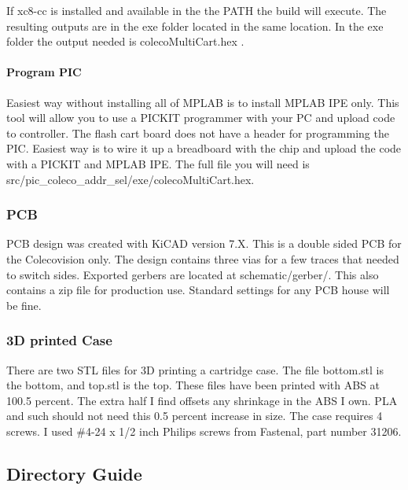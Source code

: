\documentclass{article}
\begin{document}
  If xc8-cc is installed and available in the the PATH the build will execute. The resulting
  outputs are in the exe folder located in the same location. In the exe folder the output needed is colecoMultiCart.hex .

  \paragraph{Program PIC}
  Easiest way without installing all of MPLAB is to install MPLAB IPE only. This tool will allow you to use a PICKIT programmer with your PC and upload code to controller.
  The flash cart board does not have a header for programming the PIC. Easiest way is to wire it up a breadboard with the chip and upload the code with a PICKIT and MPLAB IPE.
  The full file you will need is src/pic\_coleco\_addr\_sel/exe/colecoMultiCart.hex.


  \subsubsection{PCB}

  \par
  PCB design was created with KiCAD version 7.X. This is a double sided PCB for the Colecovision only. The
  design contains three vias for a few traces that needed to switch sides. Exported gerbers are located at
  schematic/gerber/. This also contains a zip file for production use. Standard settings for any PCB house
  will be fine.

  \subsubsection{3D printed Case}

  \par
  There are two STL files for 3D printing a cartridge case. The file bottom.stl is the bottom, and top.stl is the top.
  These files have been printed with ABS at 100.5 percent. The extra half I find offsets any shrinkage in the ABS I own.
  PLA and such should not need this 0.5 percent increase in size. The case requires 4 screws. I used \#4-24 x 1/2 inch
  Philips screws from Fastenal, part number 31206.

  \subsection{Directory Guide}

\end{document}
